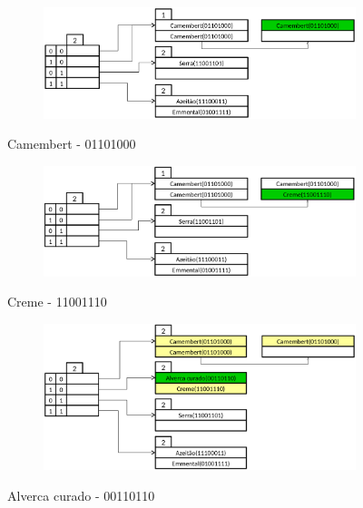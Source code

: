 \begin{figure}[H]
	\begin{center}
	\begin{subfigure}[b]{0.75\textwidth}
		\centering
		\includegraphics[width=\textwidth]{fig7.png}

	\end{subfigure}
	\caption{Camembert - 01101000}
	\end{center}
\end{figure}
\begin{figure}[H]
	\begin{center}
	\begin{subfigure}[b]{0.75\textwidth}
		\centering
		\includegraphics[width=\textwidth]{fig8.png}

	\end{subfigure}
	\caption{Creme - 11001110}
	\end{center}
\end{figure}
\begin{figure}[H]
	\begin{center}
	\begin{subfigure}[b]{0.75\textwidth}
		\centering
		\includegraphics[width=\textwidth]{fig9.png}

	\end{subfigure}
	\caption{Alverca curado - 00110110}
	\end{center}
\end{figure}